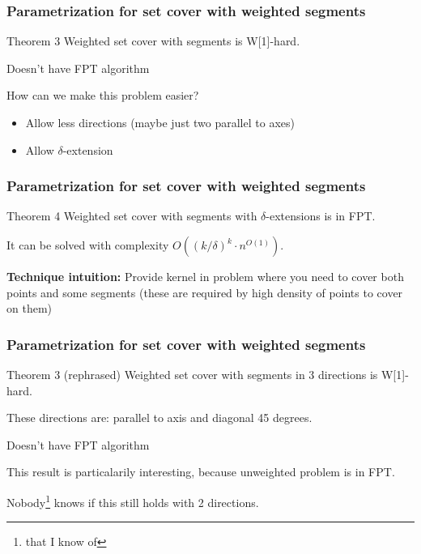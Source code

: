 \documentclass{beamer}
\begin{document}
\begin{frame}
\frametitle{Parametrization for set cover with weighted segments}
\begin{block}{Theorem 3}
	Weighted set cover with segments is W[1]-hard.
	
	Doesn't have FPT algorithm
\end{block}

How can we make this problem easier?
\begin{itemize}
\item Allow less directions (maybe just two parallel to axes)
\item Allow $\delta$-extension
\end{itemize}
\end{frame}

\begin{frame}
\frametitle{Parametrization for set cover with weighted segments}
\begin{block}{Theorem 4}
	Weighted set cover with segments 
	with $\delta$-extensions is in FPT.
	
	It can be solved with complexity $O((k/\delta)^k \cdot n^{O(1)})$.
\end{block}

\textbf{Technique intuition:} Provide kernel in problem where you need to
cover both points and some segments (these are required
by high density of points to cover on them)
\end{frame}

\begin{frame}
\frametitle{Parametrization for set cover with weighted segments}
\begin{block}{Theorem 3 (rephrased)}
	Weighted set cover with segments in 3 directions is W[1]-hard.
	
	
These directions are: parallel to axis and diagonal 45 degrees.
	
	Doesn't have FPT algorithm
\end{block}


This result is particalarily interesting, because unweighted problem is in FPT.

Nobody\footnote{that I know of} knows if this still holds with
2 directions.

\end{frame}
\end{document}
